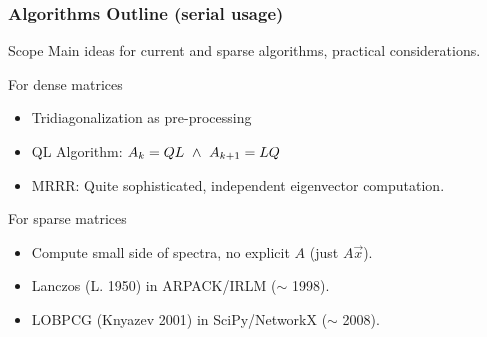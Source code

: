  \begin{frame}
  \frametitle{Algorithms Outline (serial usage)}
  \begin{block}{Scope}
    Main ideas for current and sparse algorithms, practical
    considerations. 
  \end{block}
  \begin{block}{For dense matrices}
    \begin{itemize}
      \item Tridiagonalization as pre-processing
      \item QL Algorithm: $A_k = QL \,\,\land\,\, A_{k+1} = L Q$
      \item MRRR: Quite sophisticated, independent eigenvector computation.
    \end{itemize}
  \end{block}
  \begin{block}{For sparse matrices}
    \begin{itemize}
      \item Compute small side of spectra, no explicit $A$ (just $A\vec{x}$).
    \item Lanczos (L. 1950) in ARPACK/IRLM ($\sim$ 1998).
    \item LOBPCG (Knyazev 2001) in SciPy/NetworkX ($\sim$ 2008).
    \end{itemize}
  \end{block}
\end{frame}

